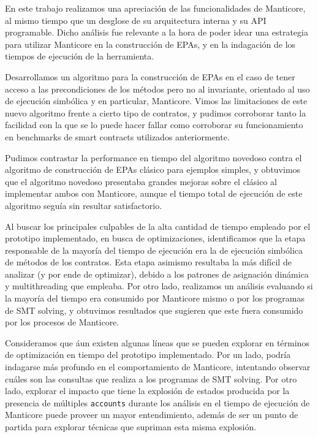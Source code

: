 En este trabajo realizamos una apreciación de las funcionalidades de Manticore, al mismo tiempo que un desglose de su arquitectura interna y su API programable.
Dicho análisis fue relevante a la hora de poder idear una estrategia para utilizar Manticore en la construcción de EPAs, y en la indagación de los tiempos de ejecución de la herramienta.

Desarrollamos un algoritmo para la construcción de EPAs en el caso de tener acceso a las precondiciones de los métodos pero no al invariante, orientado al uso de ejecución simbólica y en particular, Manticore.
Vimos las limitaciones de este nuevo algoritmo frente a cierto tipo de contratos, y pudimos corroborar tanto la facilidad con la que se lo puede hacer fallar como corroborar su funcionamiento en benchmarks de smart contracts utilizados anteriormente.

Pudimos contrastar la performance en tiempo del algoritmo novedoso contra el algoritmo de construcción de EPAs clásico para ejemplos simples, y obtuvimos que el algoritmo novedoso presentaba grandes mejoras sobre el clásico al implementar ambos con Manticore, aunque el tiempo total de ejecución de este algoritmo seguía sin resultar satisfactorio.

Al buscar los principales culpables de la alta cantidad de tiempo empleado por el prototipo implementado, en busca de optimizaciones, identificamos que la etapa responsable de la mayoría del tiempo de ejecución	era la de ejecución simbólica de métodos de los contratos.
Esta etapa asimismo resultaba la más difícil de analizar (y por ende de optimizar), debido a los patrones de asignación dinámica y multithreading que empleaba.
Por otro lado, realizamos un análisis evaluando si la mayoría del tiempo era consumido por Manticore mismo o por los programas de SMT solving, y obtuvimos resultados que sugieren que este fuera consumido por los procesos de Manticore.

Consideramos que áun existen algunas líneas que se pueden explorar en términos de optimización en tiempo del prototipo implementado.
Por un lado, podría indagarse más profundo en el comportamiento de Manticore, intentando observar cuáles son las consultas que realiza a los programas de SMT solving.
Por otro lado, explorar el impacto que tiene la explosión de estados producida por la presencia de múltiples \texttt{accounts} durante los análisis en el tiempo de ejecución de Manticore puede proveer un mayor entendimiento, además de ser un punto de partida para explorar técnicas que supriman esta misma explosión.


